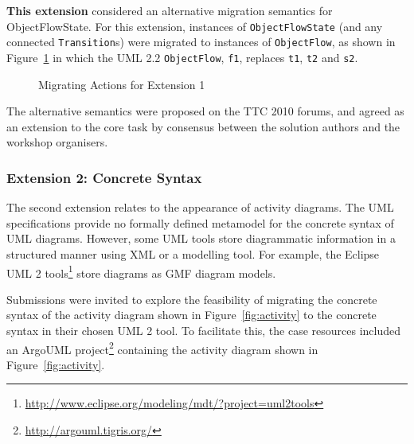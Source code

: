 \textbf{This extension} considered an alternative migration semantics for ObjectFlowState. For this extension, instances of \texttt{Ob\-je\-ctFl\-owSt\-a\-te} (and any connected \texttt{Tr\-an\-si\-ti\-on}s) were migrated to instances of  \texttt{Ob\-je\-ctFl\-ow}, as shown in Figure~\ref{fig:ofs_to_flow} in which the UML 2.2 \texttt{Ob\-je\-ctFl\-ow}, \texttt{f1}, replaces \texttt{t1}, \texttt{t2} and \texttt{s2}.

\begin{figure}[htbp]
	\centering
	\caption{Migrating Actions for Extension 1}
\label{fig:ofs_to_flow}
\end{figure}

The alternative semantics were proposed on the TTC 2010 forums, and agreed as an extension to the core task by consensus between the solution authors and the workshop organisers. 

\subsubsection{Extension 2: Concrete Syntax}
\label{sub:concrete_syntax}
The second extension relates to the appearance of activity diagrams. The UML specifications provide no formally defined metamodel for the concrete syntax of UML diagrams. However, some UML tools store diagrammatic information in a structured manner using XML or a modelling tool. For example, the Eclipse UML 2 tools\footnote{\url{http://www.eclipse.org/modeling/mdt/?project=uml2tools}} store diagrams as GMF \cite{gronback09emp} diagram models.

Submissions were invited to explore the feasibility of migrating the concrete syntax of the activity diagram shown in Figure~\ref{fig:activity} to the concrete syntax in their chosen UML 2 tool. To facilitate this, the case resources included an ArgoUML project\footnote{\url{http://argouml.tigris.org/}} containing the activity diagram shown in Figure~\ref{fig:activity}.

